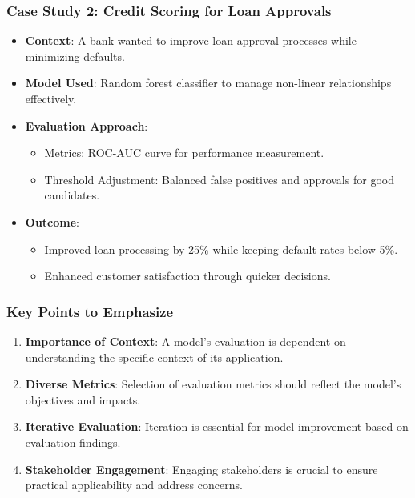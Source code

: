 \documentclass[aspectratio=169]{beamer}
\begin{document}
\begin{frame}[fragile]
    \frametitle{Case Study 2: Credit Scoring for Loan Approvals}
    
    \begin{itemize}
        \item \textbf{Context}: A bank wanted to improve loan approval processes while minimizing defaults.
        
        \item \textbf{Model Used}: Random forest classifier to manage non-linear relationships effectively.
        
        \item \textbf{Evaluation Approach}:
        \begin{itemize}
            \item Metrics: ROC-AUC curve for performance measurement.
            \item Threshold Adjustment: Balanced false positives and approvals for good candidates.
        \end{itemize}
        
        \item \textbf{Outcome}:
        \begin{itemize}
            \item Improved loan processing by 25\% while keeping default rates below 5\%.
            \item Enhanced customer satisfaction through quicker decisions.
        \end{itemize}
    \end{itemize}
\end{frame}

\begin{frame}[fragile]
    \frametitle{Key Points to Emphasize}
    
    \begin{enumerate}
        \item \textbf{Importance of Context}: A model's evaluation is dependent on understanding the specific context of its application.
        
        \item \textbf{Diverse Metrics}: Selection of evaluation metrics should reflect the model's objectives and impacts.
        
        \item \textbf{Iterative Evaluation}: Iteration is essential for model improvement based on evaluation findings.
        
        \item \textbf{Stakeholder Engagement}: Engaging stakeholders is crucial to ensure practical applicability and address concerns.
    \end{enumerate}
\end{frame}
\end{document}
